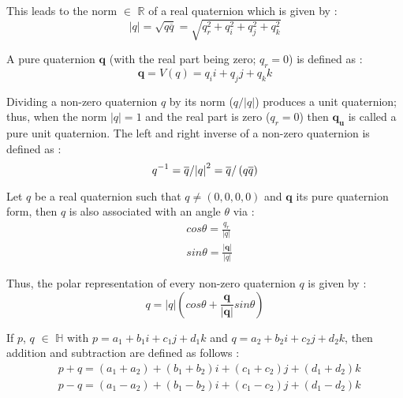 \documentclass[superscriptaddress,longbibliography,aps,prl,twocolumn,10pt]{revtex4-2}
\begin{document}
\noindent
This leads to the norm $\in$ $\mathbb{R}$ of a real quaternion which is given by \cite{Morais2014}:
    \begin{equation} \label{eq:norm}
        \left| q \right| = \sqrt {q\overline q }  = \sqrt {q_r^2 + q_i^2 + q_j^2 + q_k^2}
    \end{equation}
    
\noindent
A pure quaternion $\boldsymbol{q}$ (with the real part being zero; $q_{r}=0$) is defined as \cite{Morais2014}:
    \begin{equation} \label{eq:purequaternion}
        {\boldsymbol{q}} = V(q) = {q_i}i + {q_j}j + {q_k}k
    \end{equation}
    
\noindent
Dividing a non-zero quaternion $q$ by its norm ($q/\left|q\right|$) produces a unit quaternion; thus, when the norm $|q| = 1$ and the real part is zero ($q_{r}=0$) then $\boldsymbol{q_{u}}$ is called a pure unit quaternion. The left and right inverse of a non-zero quaternion is defined as \cite{Morais2014}:
    \begin{equation} \label{eq:inverse}
        {q^{ - 1}} = {{{\overline q } \mathord{\left/ {\vphantom {{\overline q } {\left| q \right|}}} \right. \kern-\nulldelimiterspace} {\left| q \right|}}^2} = \overline q /\left( {q\overline q } \right)
    \end{equation}

\noindent
Let $q$ be a real quaternion such that $q \neq (0,0,0,0)$ and $\boldsymbol{q}$ its pure quaternion form, then $q$ is also associated with an angle $\theta$ via \cite{Morais2014}:
    \begin{equation} \label{eq:angle}
    \begin{aligned}
        &cos \theta = \frac{q_r}{\left| q \right|} \\
        &sin \theta = \frac{\left| \boldsymbol{q} \right|}{\left| q \right|}
    \end{aligned}
    \end{equation}

\noindent
Thus, the polar representation of every non-zero quaternion $q$ is given by \cite{Morais2014}:
    \begin{equation} \label{eq:polarrepresentation}
        q = \left| q \right| \left( cos \theta + \frac{\boldsymbol{q}}{\left| \boldsymbol{q} \right|} sin \theta \right)
    \end{equation}

\noindent
If $p$, $q$ $\in$ $\mathbb{H}$ with $p = a_{1} + b_{1}i + c_{1}j + d_{1}k$ and $q = a_{2} + b_{2}i + c_{2}j + d_{2}k$, then addition and subtraction are defined as follows \cite{Morais2014}:
    \begin{equation} \label{eq:additionsubtraction}
    \begin{aligned}
        &p + q = \left( {a_{1} + a_{2}} \right) + \left( {b_{1} + b_{2}} \right)i + \left( {c_{1} + c_{2}} \right)j + \left( {d_{1} + d_{2}} \right)k\\
        &p - q = \left( {a_{1} - a_{2}} \right) + \left( {b_{1} - b_{2}} \right)i + \left( {c_{1} - c_{2}} \right)j + \left( {d_{1} - d_{2}} \right)k
    \end{aligned}
    \end{equation}
\end{document}
